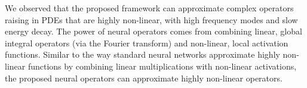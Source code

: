 \documentclass{article} %
\begin{document}
We observed that the proposed framework can approximate complex operators raising in PDEs that are highly non-linear, with high frequency modes and slow energy decay.
The power of neural operators comes from combining linear, global integral operators (via the Fourier transform) and non-linear, local activation functions.  Similar to the way standard neural networks approximate highly non-linear functions by combining linear multiplications with non-linear activations, the proposed neural operators can approximate highly non-linear operators.
\end{document}
